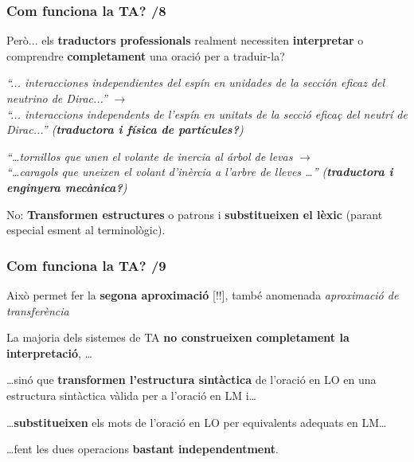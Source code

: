\documentclass{beamer}
\newcommand{\empha}[1]{\emph{#1}\/}
\begin{document}
\begin{frame}
\frametitle{ Com funciona la TA? /8}

 { {Però... els \textbf{traductors
      professionals} realment necessiten \textbf{interpretar} o
    comprendre \textbf{completament} una oració per a
    traduir-la?}

{
\begin{center}
  \textsl{``... interacciones independientes del espín en unidades de la
  sección eficaz del neutrino de Dirac...''} $\to$ \\
  \textsl{\empha{``... interaccions independents de l'espín en unitats de la secció
  eficaç del neutrí de Dirac...''} (\textbf{traductora i física de partícules?})}
\end{center}
}
{
\begin{center}
\textsl{``\ldots tornillos que unen el volante de inercia al árbol de levas}
 $\to$ \\
\textsl{\empha{``\ldots caragols que uneixen el volant d'inèrcia a l'arbre
de lleves \ldots''} (\textbf{traductora i enginyera mecànica?})}
\end{center}
} {No: \textbf{Transformen estructures} o patrons i
\textbf{substitueixen el lèxic} (parant especial esment al
terminològic).} 
}

\end{frame}


\begin{frame}
\frametitle{ Com funciona la TA?  /9}

{
{Això permet fer la \textbf{segona aproximació} [!!], també anomenada \empha{aproximació de transferència}}
\begin{itemize}\setlength{\itemsep}{0pt}
{\item[] La majoria dels sistemes de TA \textbf{no construeixen
    completament la interpretació}, \ldots}

\pause
{\item[]\ldots sinó que \textbf{transformen l'estructura sintàctica} de
  l'oració en LO en una estructura sintàctica vàlida per a l'oració en
  LM i\ldots}

\pause
{\item[]\ldots \textbf{substitueixen} els  mots de l'oració en LO per
  equivalents adequats en LM\ldots }

\pause
{\item[]\ldots fent les dues operacions \textbf{bastant
    independentment}.}
\end{itemize}
}

\end{frame}
\end{document}
